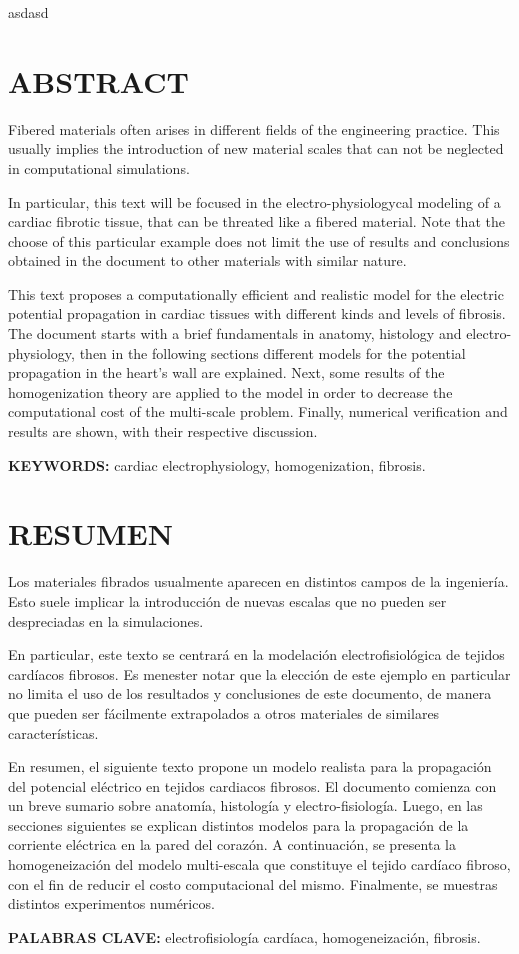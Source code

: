 \documentclass[letterpaper]{article}     	    %
\newcommand{\ssection}[1]{\section[#1]{\fontsize{11}{12}\selectfont \centering #1}}
\begin{document}
asdasd
\newpage

\ssection{ABSTRACT}

Fibered materials often arises in different fields of the engineering practice. This usually implies the introduction of new material scales that can not be neglected in computational simulations.

In particular, this text will be focused in the electro-physiologycal modeling of a cardiac fibrotic tissue, that can be threated like a fibered material. Note that the choose of this particular example does not limit the use of results and conclusions obtained in the document to other materials with similar nature.

This text proposes a computationally efficient and realistic model for the electric potential propagation in cardiac tissues with different kinds and levels of fibrosis. The document starts with a brief fundamentals in anatomy, histology and electro-physiology, then in the following sections different models for the potential propagation in the heart's wall are explained. Next, some results of the homogenization theory are applied to the model in order to decrease the computational cost of the multi-scale problem. Finally, numerical verification and results are shown, with their respective discussion.

\textbf{KEYWORDS:} \small{cardiac electrophysiology, homogenization, fibrosis.}


\ssection{RESUMEN}

Los materiales fibrados usualmente aparecen en distintos campos de la ingeniería. Esto suele implicar la introducción de nuevas escalas que no pueden ser despreciadas en la simulaciones. 

En particular, este texto se centrará en la modelación electrofisiológica de tejidos cardíacos fibrosos. Es menester notar que la elección de este ejemplo en particular no limita el uso de los resultados y conclusiones de este documento, de manera que pueden ser fácilmente extrapolados a otros materiales de similares características.

En resumen, el siguiente texto propone un modelo realista para la propagación del potencial eléctrico en tejidos cardiacos fibrosos. El documento comienza con un breve sumario sobre anatomía, histología y electro-fisiología. Luego, en las secciones siguientes se explican distintos modelos para la propagación de la corriente eléctrica en la pared del corazón. A continuación, se presenta la homogeneización del modelo multi-escala que constituye el tejido cardíaco fibroso, con el fin de reducir el costo computacional del mismo. Finalmente, se muestras distintos experimentos numéricos.

\textbf{PALABRAS CLAVE:} \small{electrofisiología cardíaca, homogeneización, fibrosis.}
\end{document}
